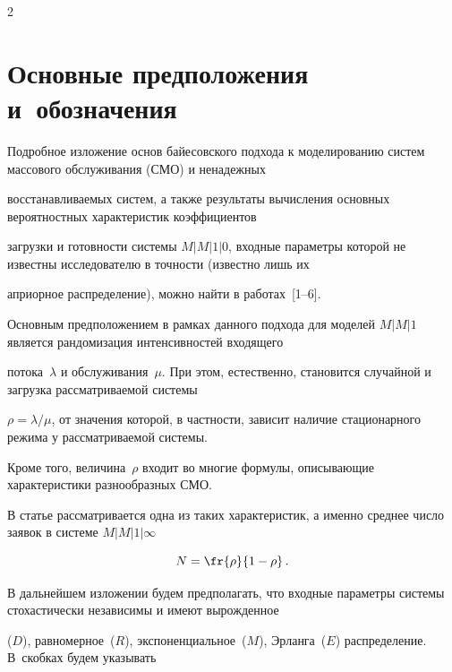       \begin{multicols}{2}





      \label{st\stat}








\section{Основные предположения и~обозначения}





Подробное изложение основ байесовского подхода к моделированию систем массового обслуживания (СМО) и ненадежных


восстанавливаемых систем, а также результаты вычисления основных вероятностных характеристик коэффициентов


загрузки и готовности системы $M|M|1|0$, входные параметры которой не известны исследователю в точности (известно лишь их


априорное распределение), можно найти в работах~[1--6].





Основным предположением в рамках данного подхода для моделей $M|M|1$ является рандомизация интенсивностей входящего


потока~$\lambda$ и обслуживания~$\mu$. При этом, естественно, становится случайной и загрузка рассматриваемой системы


$\rho=\lambda/\mu$, от значения которой, в частности, зависит наличие стационарного режима у рассматриваемой системы.


Кроме того, величина~$\rho$ входит во многие формулы, описывающие характеристики разнообразных СМО.


В статье рассматривается одна из таких характеристик, а именно среднее число заявок в системе  $M|M|1|\infty$


$$


N=\fr{\rho}{1-\rho}\,.


$$





В дальнейшем изложении будем предполагать, что входные параметры системы стохастически независимы и имеют вырожденное


($D$), равномерное~($R$), экспоненциальное~($M$), Эрланга~($E$) распределение. В~скобках будем указывать



\end{multicols}
